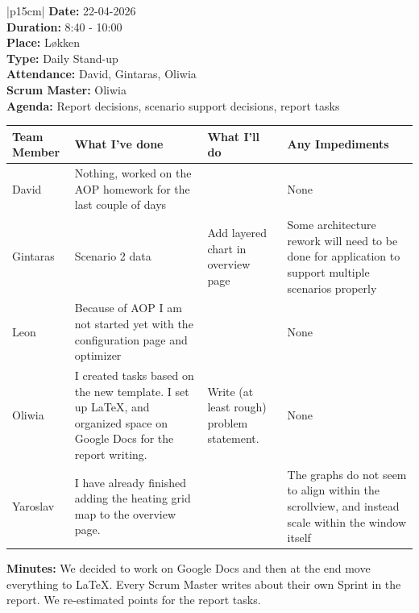 \begin{table}[H]
    \centering
    \begin{tabular}{|p{15cm}|}   
        \hline
        \textbf{Date:}  22-04-2026 \\
        \textbf{Duration:} 8:40 - 10:00 \\
        \textbf{Place:}  Løkken \\
        \textbf{Type:} Daily Stand-up \\
        \textbf{Attendance:} David, Gintaras, Oliwia \\
        \textbf{Scrum Master:}  Oliwia \\
        \textbf{Agenda:} Report decisions, scenario support decisions, report tasks
        \begin{table}[H]
            \begin{tabular}{|p{1.75cm}|p{4cm}|p{4cm}|p{4cm}|}
                \hline
                \cellcolor[HTML]{BFBFBF}  \textbf{Team Member} & \cellcolor[HTML]{BFBFBF}  \textbf{What I've done} & \cellcolor[HTML]{BFBFBF}  \textbf{What I'll do} & \cellcolor[HTML]{BFBFBF}  \textbf{Any Impediments}\\
                \hline
                \cellcolor[HTML]{d4d4d4} David & Nothing, worked on the AOP homework for the last couple of days &  & None \\
                \hline
                \cellcolor[HTML]{d4d4d4} Gintaras & Scenario 2 data & Add layered chart in overview page & Some architecture rework will need to be done for application to support multiple scenarios properly \\
                \hline
                \cellcolor[HTML]{d4d4d4} Leon & Because of AOP I am not started yet with the configuration page and optimizer &  & None \\
                \hline
                \cellcolor[HTML]{d4d4d4} Oliwia & I created tasks based on the new template. I set up LaTeX, and organized space on Google Docs for the report writing. & Write (at least rough) problem statement. & None \\
                \hline
                \cellcolor[HTML]{d4d4d4} Yaroslav & I have already finished adding the heating grid map to the overview page. &  & The graphs do not seem to align within the scrollview, and instead scale within the window itself \\
                \hline
            \end{tabular}
        \end{table}
        \textbf{Minutes:} We decided to work on Google Docs and then at the end move everything to LaTeX. Every Scrum Master writes about their own Sprint in the report. We re-estimated points for the report tasks. \\
        \hline
    \end{tabular}
\end{table}

